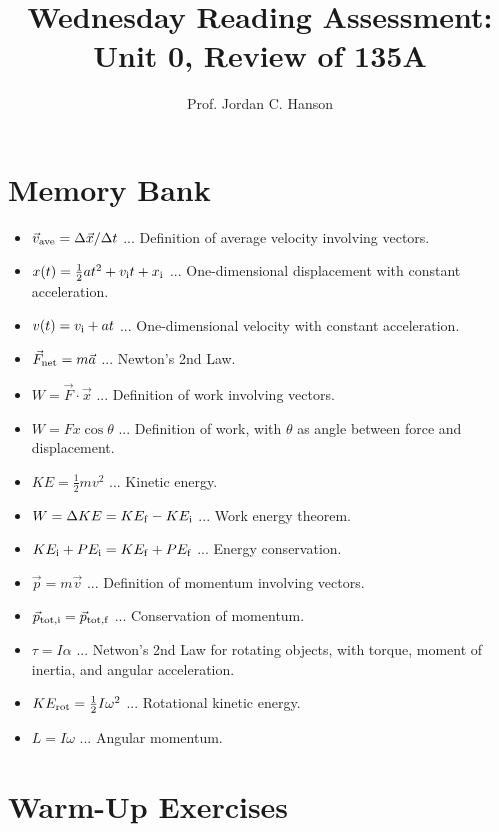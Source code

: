 \documentclass{article}
\begin{document}
\title{Wednesday Reading Assessment: Unit 0, Review of 135A}
\author{Prof. Jordan C. Hanson}

\maketitle

\section{Memory Bank}

\begin{itemize}
\item $\vec{v}_{\rm ave} = \Delta\vec{x}/\Delta t$ ... Definition of average velocity involving vectors.
\item $x(t) = \frac{1}{2}at^2 + v_{\rm i} t + x_{\rm i}$ ... One-dimensional displacement with constant acceleration.
\item $v(t) = v_{\rm i} + a t$ ... One-dimensional velocity with constant acceleration. 
\item $\vec{F}_{\rm net} = m\vec{a}$ ... Newton's 2nd Law.
\item $W = \vec{F} \cdot \vec{x}$ ... Definition of work involving vectors.
\item $W = Fx\cos\theta$ ... Definition of work, with $\theta$ as angle between force and displacement.
\item $KE = \frac{1}{2} m v^2$ ... Kinetic energy.
\item $W = \Delta KE = KE_{\rm f} - KE_{\rm i}$ ... Work energy theorem.
\item $KE_{\rm i} + PE_{\rm i} = KE_{\rm f} + PE_{\rm f}$ ... Energy conservation.
\item $\vec{p} = m\vec{v}$ ... Definition of momentum involving vectors.
\item $\vec{p}_{\rm tot,i} = \vec{p}_{\rm tot,f}$ ... Conservation of momentum.
\item $\tau = I\alpha$ ... Netwon's 2nd Law for rotating objects, with torque, moment of inertia, and angular acceleration.
\item $KE_{\rm rot} = \frac{1}{2}I \omega^2$ ... Rotational kinetic energy.
\item $L = I \omega$ ... Angular momentum.
\end{itemize}

\clearpage

\section{Warm-Up Exercises}
\end{document}

